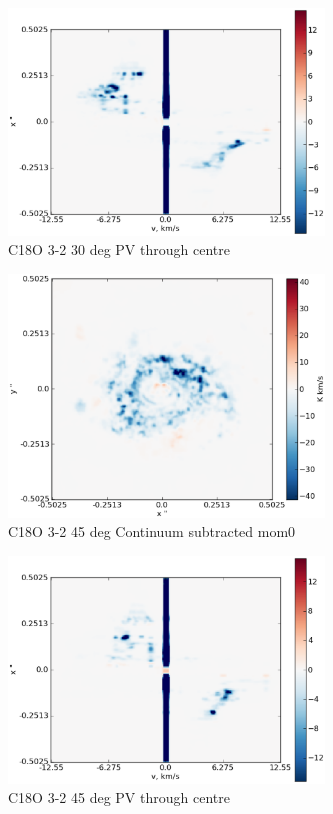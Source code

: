 \documentclass[useAMS,usenatbib]{mn2e}
\begin{document}
%

\begin{figure}
 \includegraphics[width=84mm]{Figures/sim/imageC18O_3-2_30deg_PV_centre.eps}

 \caption{C18O 3-2 30 deg PV through centre}
\end{figure}

\begin{figure}
 \includegraphics[width=84mm]{Figures/sim/imageC18O_3-2_45deg_contSub.eps}

 \caption{C18O 3-2 45 deg Continuum subtracted mom0}
\end{figure}

%

\begin{figure}
 \includegraphics[width=84mm]{Figures/sim/imageC18O_3-2_45deg_PV_centre.eps}

 \caption{C18O 3-2 45 deg PV through centre}
\end{figure}
\end{document}
